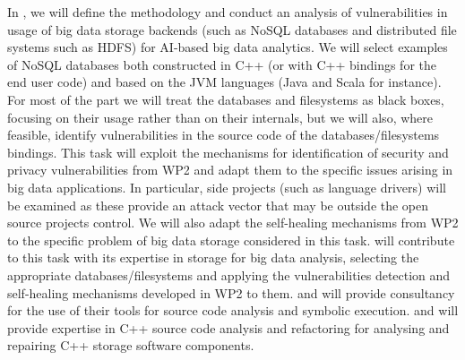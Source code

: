 \begin{Workpackage}{\thewpno}
\begin{Task}
\TaskResults{%
\ref{del:bigdata1},
\ref{del:bigdata2},
\ref{del:bigdata3}
}
\TaskHeader{}
In \theTask, we will define the methodology and conduct an analysis of vulnerabilities in usage of big data storage backends (such as NoSQL databases and distributed file systems such as HDFS) for AI-based big data analytics.  We will select examples of NoSQL databases both constructed in C++ (or with C++ bindings for the end user code) and based on the JVM languages (Java and Scala for instance). For most of the part we will treat the databases and filesystems as black boxes, focusing on their usage rather than on their internals, but we will also, where feasible, identify vulnerabilities in the source code of the databases/filesystems bindings. This task will exploit the mechanisms for identification of security and privacy vulnerabilities from WP2 and adapt them to the specific issues arising in big data applications. In particular, side projects (such as language drivers) will be examined as these provide an attack vector that may be outside the open source projects control. We will also adapt the self-healing mechanisms from WP2 to the specific problem of big data storage considered in this task. 
\UODshort{} will contribute to this task with its expertise in storage for big data analysis, selecting the appropriate databases/filesystems and applying the vulnerabilities detection and self-healing mechanisms developed in WP2 to them. 
\IBMshort{} and \YAGshort{} will provide consultancy for the use of their tools for source code analysis and symbolic execution. 
\UCMshort{} and \USTANshort{} will provide expertise in C++ source code analysis and refactoring for analysing and repairing C++ storage software components.
 \end{Task}


\end{Workpackage}
